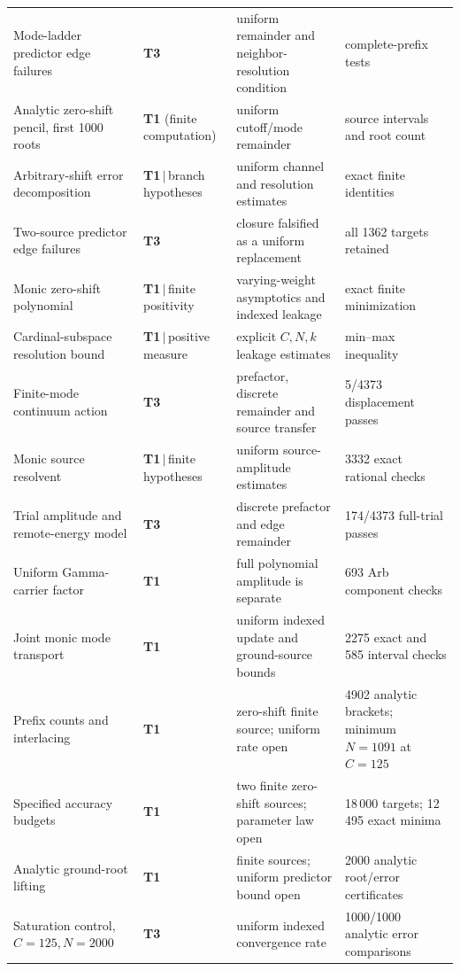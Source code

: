 \documentclass[11pt,a4paper]{article}
\begin{document}
{\begin{longtable}{@{}p{4.6cm} p{2.7cm} p{4.6cm} p{2.4cm}@{}}
Mode-ladder predictor edge failures & \textbf{T3} & uniform remainder and neighbor-resolution condition & complete-prefix tests \\
Analytic zero-shift pencil, first 1000 roots & \textbf{T1} (finite computation) & uniform cutoff/mode remainder & source intervals and root count \\
Arbitrary-shift error decomposition & \textbf{T1}$\,|\,$branch hypotheses & uniform channel and resolution estimates & exact finite identities \\
Two-source predictor edge failures & \textbf{T3} & closure falsified as a uniform replacement & all 1362 targets retained \\
Monic zero-shift polynomial & \textbf{T1}$\,|\,$finite positivity & varying-weight asymptotics and indexed leakage & exact finite minimization \\
Cardinal-subspace resolution bound & \textbf{T1}$\,|\,$positive measure & explicit $C,N,k$ leakage estimates & min--max inequality \\
Finite-mode continuum action & \textbf{T3} & prefactor, discrete remainder and source transfer & 5/4373 displacement passes \\
Monic source resolvent & \textbf{T1}$\,|\,$finite hypotheses & uniform source-amplitude estimates & 3332 exact rational checks \\
Trial amplitude and remote-energy model & \textbf{T3} & discrete prefactor and edge remainder & 174/4373 full-trial passes \\
Uniform Gamma-carrier factor & \textbf{T1} & full polynomial amplitude is separate & 693 Arb component checks \\
Joint monic mode transport & \textbf{T1} & uniform indexed update and ground-source bounds & 2275 exact and 585 interval checks \\
Prefix counts and interlacing & \textbf{T1} & zero-shift finite source; uniform rate open & 4902 analytic brackets; minimum $N=1091$ at $C=125$ \\
Specified accuracy budgets & \textbf{T1} & two finite zero-shift sources; parameter law open & 18\,000 targets; 12\,495 exact minima \\
Analytic ground-root lifting & \textbf{T1} & finite sources; uniform predictor bound open & 2000 analytic root/error certificates \\
Saturation control, $C=125,N=2000$ & \textbf{T3} & uniform indexed convergence rate & 1000/1000 analytic error comparisons \\

\end{longtable}}
\end{document}
